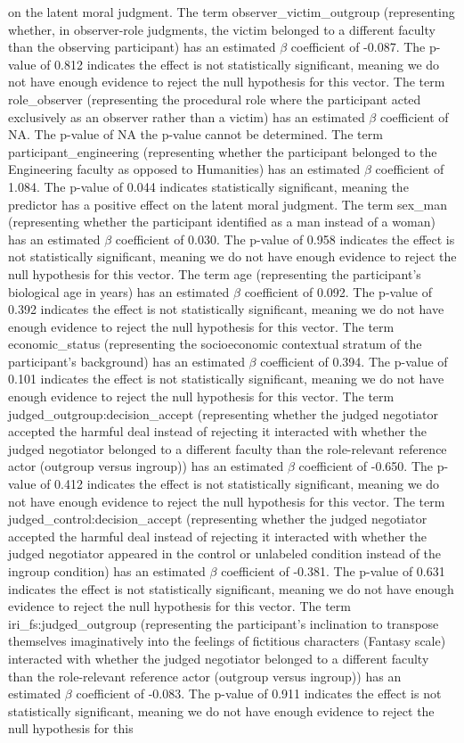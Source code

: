 \documentclass[11pt]{article}
\begin{document}
on the latent moral judgment. The term observer\_victim\_outgroup (representing whether, in observer-role judgments, the victim belonged to a different faculty than the observing participant) has an estimated $\beta$ coefficient of -0.087. The p-value of 0.812 indicates the effect is not statistically significant, meaning we do not have enough evidence to reject the null hypothesis for this vector. The term role\_observer (representing the procedural role where the participant acted exclusively as an observer rather than a victim) has an estimated $\beta$ coefficient of NA. The p-value of NA the p-value cannot be determined. The term participant\_engineering (representing whether the participant belonged to the Engineering faculty as opposed to Humanities) has an estimated $\beta$ coefficient of 1.084. The p-value of 0.044 indicates statistically significant, meaning the predictor has a positive effect on the latent moral judgment. The term sex\_man (representing whether the participant identified as a man instead of a woman) has an estimated $\beta$ coefficient of 0.030. The p-value of 0.958 indicates the effect is not statistically significant, meaning we do not have enough evidence to reject the null hypothesis for this vector. The term age (representing the participant's biological age in years) has an estimated $\beta$ coefficient of 0.092. The p-value of 0.392 indicates the effect is not statistically significant, meaning we do not have enough evidence to reject the null hypothesis for this vector. The term economic\_status (representing the socioeconomic contextual stratum of the participant's background) has an estimated $\beta$ coefficient of 0.394. The p-value of 0.101 indicates the effect is not statistically significant, meaning we do not have enough evidence to reject the null hypothesis for this vector. The term judged\_outgroup:decision\_accept (representing whether the judged negotiator accepted the harmful deal instead of rejecting it interacted with whether the judged negotiator belonged to a different faculty than the role-relevant reference actor (outgroup versus ingroup)) has an estimated $\beta$ coefficient of -0.650. The p-value of 0.412 indicates the effect is not statistically significant, meaning we do not have enough evidence to reject the null hypothesis for this vector. The term judged\_control:decision\_accept (representing whether the judged negotiator accepted the harmful deal instead of rejecting it interacted with whether the judged negotiator appeared in the control or unlabeled condition instead of the ingroup condition) has an estimated $\beta$ coefficient of -0.381. The p-value of 0.631 indicates the effect is not statistically significant, meaning we do not have enough evidence to reject the null hypothesis for this vector. The term iri\_fs:judged\_outgroup (representing the participant's inclination to transpose themselves imaginatively into the feelings of fictitious characters (Fantasy scale) interacted with whether the judged negotiator belonged to a different faculty than the role-relevant reference actor (outgroup versus ingroup)) has an estimated $\beta$ coefficient of -0.083. The p-value of 0.911 indicates the effect is not statistically significant, meaning we do not have enough evidence to reject the null hypothesis for this 
\end{document}
